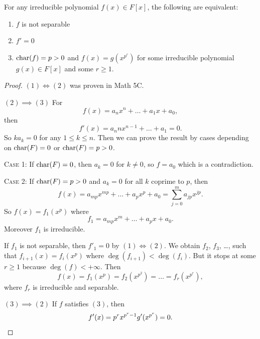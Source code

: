 \begin{lemma}\label{lemma:5.4}
For any irreducible polynomial $f(x)\in F[x]$, the following are equivalent:
\begin{enumerate}
\item $f$ is not separable
\item $f'=0$
\item $\operatorname{char}(f)=p>0$ and $f(x)=g(x^{p^{r}})$ for some irreducible
  polynomial $g(x)\in F[x]$ and some $r\geq1$.
\end{enumerate}
\end{lemma}

\begin{proof}
$(1)\iff(2)$ was proven in Math 5C.

$(2)\implies(3)$ For 
\begin{equation}
f(x)=a_{n}x^{n}+\dots+a_{1}x+a_{0},
\end{equation}
then
\begin{equation}
f'(x)=a_{n}nx^{n-1}+\dots+a_{1}=0.
\end{equation}
So $ka_{k}=0$ for any $1\leq k\leq n$. Then we can prove the result by
cases depending on $\operatorname{char}(F)=0$ or $\operatorname{char}(F)=p>0$.

\textsc{Case 1:}
If $\operatorname{char}(F)=0$, then $a_{k}=0$ for $k\neq0$, so $f=a_{0}$ which is a
contradiction.

\textsc{Case 2:}
If $\operatorname{char}(F)=p>0$ and $a_{k}=0$ for all $k$ coprime to $p$, then
\begin{equation}
f(x)=a_{mp}x^{mp}+\dots+a_{p}x^{p}+a_{0}=\sum^{m}_{j=0}a_{jp}x^{jp}.
\end{equation}
So $f(x)=f_{1}(x^{p})$ where
\begin{equation}
f_{1}=a_{mp}x^{m}+\dots+a_{p}x+a_{0}.
\end{equation}
Moreover $f_{1}$ is irreducible.

If $f_{1}$ is not separable, then $f'_{1}=0$ by $(1)\iff(2)$.
We obtain $f_{2}$, $f_{3}$, \dots, such that $f_{i+1}(x)=f_{i}(x^{p})$
where $\deg(f_{i+1})<\deg(f_{i})$. But it stops at some $r\geq1$
because $\deg(f)<+\infty$. Then
\begin{equation}
f(x)=f_{1}(x^{p})=f_{2}(x^{p^{2}})=\dots=f_{r}(x^{p^{r}}),
\end{equation}
where $f_{r}$ is irreducible and separable.

$(3)\implies(2)$ If $f$ satisfies $(3)$, then
\begin{equation*}
f'(x)=p^{r}x^{p^{r}-1}g'(x^{p^{r}})=0.\qedhere
\end{equation*}
\end{proof}

